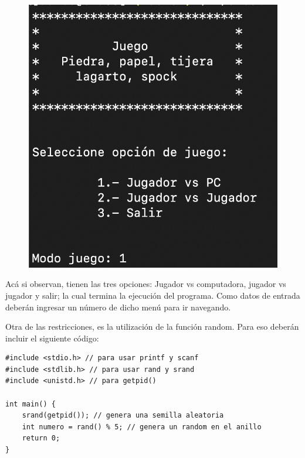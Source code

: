 \documentclass[]{article}
\begin{document}
    \begin{figure}[H]
        \includegraphics[scale=0.5]{ejPantallaInicial}
        \label{img.2}
    \end{figure}

    Acá si observan, tienen las tres opciones: Jugador vs computadora, jugador vs jugador y salir; la cual termina la ejecución del programa. Como datos de entrada deberán ingresar un número de dicho menú para ir navegando.

    Otra de las restricciones, es la utilización de la función random. Para eso deberán incluir el siguiente código:\\

    \begin{listing}[H]
        \begin{verbatim}
#include <stdio.h> // para usar printf y scanf
#include <stdlib.h> // para usar rand y srand
#include <unistd.h> // para getpid()

int main() {
    srand(getpid()); // genera una semilla aleatoria
    int numero = rand() % 5; // genera un random en el anillo
    return 0;
}
        \end{verbatim}
        \label{code.1}
    \end{listing}
\end{document}
